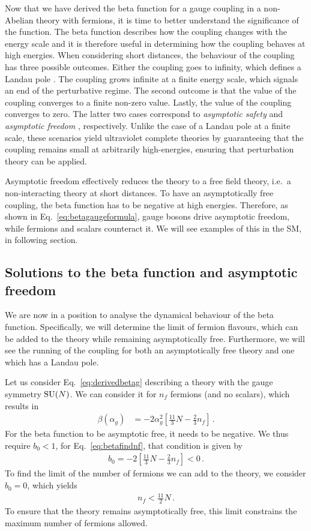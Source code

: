 Now that we have derived the beta function for a gauge coupling in a non-Abelian theory with fermions, it is time to better understand the significance of the function. The beta function describes how the coupling changes with the energy scale and it is therefore useful in determining how the coupling behaves at high energies. When considering short distances, the behaviour of the coupling has three possible outcomes. Either the coupling goes to infinity, which defines a Landau pole \cite{Landau:1954nau}. The coupling grows infinite at a finite energy scale, which signals an end of the perturbative regime. The second outcome is that the value of the coupling converges to a finite non-zero value. Lastly, the value of the coupling converges to zero. The latter two cases correspond to \textit{asymptotic safety} \cite{Weinberg:1980gg} and \textit{asymptotic freedom} \cite{Gross:1973id,Politzer:1973fx}, respectively. Unlike the case of a Landau pole at a finite scale, these scenarios yield ultraviolet complete theories by guaranteeing that the coupling remains small at arbitrarily high-energies, ensuring that perturbation theory can be applied. 

Asymptotic freedom effectively reduces the theory to a free field theory, i.e.\ a non-interacting theory at short distances. To have an asymptotically free coupling, the beta function has to be negative at high energies. Therefore, as shown in Eq.~\eqref{eq:betagaugeformula}, gauge bosons drive asymptotic freedom, while fermions and scalars counteract it. We will see examples of this in the SM, in following section.  

\subsection{Solutions to the beta function and asymptotic freedom}
We are now in a position to analyse the dynamical behaviour of the beta function. Specifically, we will determine the limit of fermion flavours, which can be added to the theory while remaining asymptotically free. Furthermore, we will see the running of the coupling for both an asymptotically free theory and one which has a Landau pole. 

Let us consider Eq.~\eqref{eq:derivedbetag} describing a theory with the gauge symmetry $\mathrm{SU}(N)$. We can consider it for $n_f$ fermions (and no scalars), which results in 
\begin{align}
    \beta(\alpha_g)&= -2\alpha_g^2 \left[ \frac{11}{3} N - \frac{2}{3} n_f \right]\,.\label{eq:betafindnf}
\end{align}
For the beta function to be asymptotic free, it needs to be negative. We thus require $b_0<1$, for Eq.~\eqref{eq:betafindnf}, that condition is given by
\begin{align}
    b_0 =-2\left[ \frac{11}{3} N - \frac{2}{3} n_f \right]<0\,.
\end{align}
To find the limit of the number of fermions we can add to the theory, we consider $b_0=0$, which yields
\begin{align}
    n_f < \frac{11}{2}N\,.
\end{align} 
To ensure that the theory remains asymptotically free, this limit constrains the maximum number of fermions allowed.

